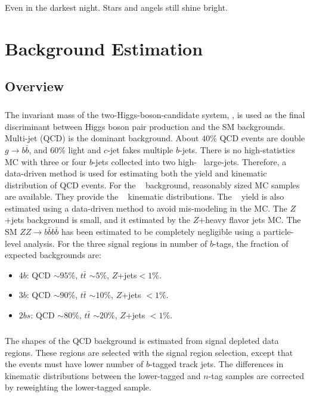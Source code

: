 \begin{savequote}[75mm]
Even in the darkest night. Stars and angels still shine bright.   
\end{savequote}


\chapter{Background Estimation}

\section{Overview}
\paragraph{}
The invariant mass of the two-Higgs-boson-candidate system, \mtwoJ, is used as the final discriminant between Higgs boson pair production and the SM backgrounds.
Multi-jet (QCD) is the dominant background. 
About $40\%$ QCD events are double $g \to b\bar{b}$, and $60\%$ light and $c$-jet fakes multiple $b$-jets.
There is no high-statistics MC with three or four $b$-jets collected into two high-\pt~ large-\R jets.
Therefore, a data-driven method is used for estimating both the yield and kinematic distribution of QCD events.
For the \ttbar~ background, reasonably sized MC samples are available. 
They provide the \ttbar~ kinematic distributions.
The \ttbar~ yield is also estimated using a data-driven method to avoid mis-modeling in the MC.
The $Z$+jets background is small, and it estimated by the $Z$+heavy flavor jets MC.
The SM $ZZ\to b\bar{b}b\bar{b}$ has been estimated to be completely negligible using a particle-level analysis.
For the three signal regions in number of $b$-tags, the fraction of expected backgrounds are:
\begin{itemize}
	\item $4b$: QCD $\sim 95\%$, $t\bar{t}$ $\sim 5\%$, $Z$+jets$< 1\%$. 
	\item $3b$: QCD $\sim 90\%$, $t\bar{t}$ $\sim 10\%$, $Z$+jets $< 1\%$.  
	\item $2bs$: QCD $\sim 80\%$, $t\bar{t}$ $\sim 20\%$, $Z$+jets $< 1\%$.
\end{itemize}

\paragraph{}
The shapes of the QCD background is estimated from signal depleted data regions. 
These regions are selected with the signal region selection, except that the events must have lower number of $b$-tagged track jets.
The differences in kinematic distributions between the lower-tagged and $n$-tag samples are corrected by reweighting the lower-tagged sample.

